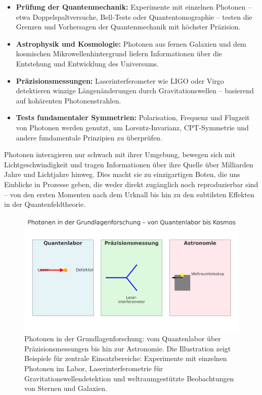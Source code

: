 \begin{itemize}
	\item \textbf{Prüfung der Quantenmechanik:} Experimente mit einzelnen Photonen – etwa Doppelspaltversuche, Bell-Tests oder Quantentomographie – testen die Grenzen und Vorhersagen der Quantenmechanik mit höchster Präzision.
	\item \textbf{Astrophysik und Kosmologie:} Photonen aus fernen Galaxien und dem kosmischen Mikrowellenhintergrund liefern Informationen über die Entstehung und Entwicklung des Universums.
	\item \textbf{Präzisionsmessungen:} Laserinterferometer wie LIGO oder Virgo detektieren winzige Längenänderungen durch Gravitationswellen – basierend auf kohärenten Photonenstrahlen.
	\item \textbf{Tests fundamentaler Symmetrien:} Polarisation, Frequenz und Flugzeit von Photonen werden genutzt, um Lorentz-Invarianz, CPT-Symmetrie und andere fundamentale Prinzipien zu überprüfen.
	
\end{itemize}
\medskip
\begin{tcolorbox}[physikbox, title={Photonen als Boten der Naturgesetze}, label={box:photonen_grundlagen}]
	\small
	Photonen interagieren nur schwach mit ihrer Umgebung, bewegen sich mit Lichtgeschwindigkeit und tragen Informationen über ihre Quelle über Milliarden Jahre und Lichtjahre hinweg. 
	Dies macht sie zu einzigartigen Boten, die uns Einblicke in Prozesse geben, die weder direkt zugänglich noch reproduzierbar sind – von den ersten Momenten nach dem Urknall bis hin zu den subtilsten Effekten in der Quantenfeldtheorie.
\end{tcolorbox}
\begin{figure}[H]
	\centering
	\includegraphics[width=0.9\linewidth]{bilder/photonen_grundlagenforschung.png} %
	\caption{Photonen in der Grundlagenforschung: 
		vom Quantenlabor über Präzisionsmessungen bis hin zur Astronomie. 
		Die Illustration zeigt Beispiele für zentrale Einsatzbereiche: 
		Experimente mit einzelnen Photonen im Labor, Laserinterferometrie für Gravitationswellendetektion und weltraumgestützte Beobachtungen von Sternen und Galaxien.}
	\label{fig:photonen_grundlagen}
\end{figure}

